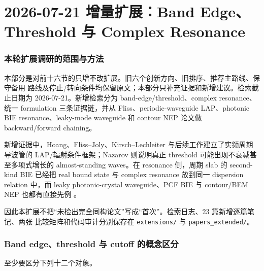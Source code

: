 \documentclass[UTF8,11pt,fontset=none]{ctexart}
\begin{document}
\clearpage
{}
\part*{2026-07-21 增量扩展：Band Edge、Threshold 与 Complex Resonance}

\section{本轮扩展调研的范围与方法}

本部分是对前十六节的只增不改扩展。旧六个创新方向、旧排序、推荐主路线、保守备用
路线及停止/转向条件均保留原文；本部分只补充证据和新增建议。检索截止日期为
2026-07-21。新增检索分为 band-edge/threshold、complex resonance、统一 formulation
三条证据链，并从 Fliss、periodic-waveguide LAP、photonic BIE resonance、leaky-mode
waveguide 和 contour NEP 论文做 backward/forward chaining。

新增证据中，Hoang、Fliss--Joly、Kirsch--Lechleiter 与后续工作建立了实频周期导波管的
LAP/辐射条件框架\cite{Hoang2011LAP,FlissJoly2016Radiation,KirschLechleiter2018,
KirschSchweizer2025}；Nazarov 则说明真正 threshold 可能出现不衰减甚至多项式增长的
almost-standing waves\cite{Nazarov2020Threshold}。在 resonance 侧，周期 slab 的
second-kind BIE 已经把 real bound state 与 complex resonance 放到同一 dispersion
relation 中\cite{ShipmanVenakides2003,ShipmanVenakides2005}，而 leaky photonic-crystal
waveguide、PCF BIE 与 contour/BEM NEP 也都有直接先例
\cite{LiLu2010LeakyWaveguides,LuLu2012PCF,LaiJiang2018,PerrusselPoirier2024}。

因此本扩展不把“未检出完全同构论文”写成“首次”。检索日志、23 篇新增逐篇笔记、两张
比较矩阵和代码审计分别保存在 \texttt{extensions/} 与
\texttt{papers\_extended/}。

\section{Band edge、threshold 与 cutoff 的概念区分}

至少要区分下列十二个对象。
\end{document}
